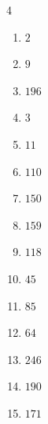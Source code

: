 \begin{multicols}{4}
\begin{enumerate}
  \item $2$


  \item $9$


  \item $196$


  \item $3$


  \item $11$


  \item $110$


  \item $150$


  \item $159$


  \item $118$


  \item $45$


  \item $85$


  \item $64$


  \item $246$


  \item $190$


  \item $171$


\columnbreak %

\resetques


\end{enumerate}
\end{multicols}
